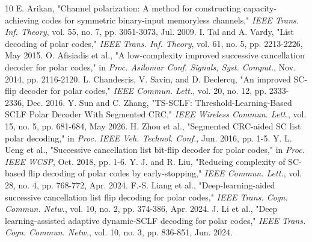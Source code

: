 \documentclass[journal,10pt,twocolumn]{IEEEtran}
\begin{document}
\begin{thebibliography}{10}
 E. Arikan, "Channel polarization: A method for constructing capacity-achieving codes for symmetric binary-input memoryless channels," \emph{IEEE Trans. Inf. Theory}, vol. 55, no. 7, pp. 3051-3073, Jul. 2009.
 I. Tal and A. Vardy, "List decoding of polar codes," \emph{IEEE Trans. Inf. Theory}, vol. 61, no. 5, pp. 2213-2226, May 2015.
 O. Afisiadis et al., "A low-complexity improved successive cancellation decoder for polar codes," in \emph{Proc. Asilomar Conf. Signals, Syst. Comput.}, Nov. 2014, pp. 2116-2120.
 L. Chandesris, V. Savin, and D. Declercq, "An improved SC-flip decoder for polar codes," \emph{IEEE Commun. Lett.}, vol. 20, no. 12, pp. 2333-2336, Dec. 2016.
 Y. Sun and C. Zhang, "TS-SCLF: Threshold-Learning-Based SCLF Polar Decoder With Segmented CRC," \emph{IEEE Wireless Commun. Lett.}, vol. 15, no. 5, pp. 681-684, May 2026.
 H. Zhou et al., "Segmented CRC-aided SC list polar decoding," in \emph{Proc. IEEE Veh. Technol. Conf.}, Jun. 2016, pp. 1-5.
 Y. L. Ueng et al., "Successive cancellation list bit-flip decoder for polar codes," in \emph{Proc. IEEE WCSP}, Oct. 2018, pp. 1-6.
 Y. J. and R. Liu, "Reducing complexity of SC-based flip decoding of polar codes by early-stopping," \emph{IEEE Commun. Lett.}, vol. 28, no. 4, pp. 768-772, Apr. 2024.
 F.-S. Liang et al., "Deep-learning-aided successive cancellation list flip decoding for polar codes," \emph{IEEE Trans. Cogn. Commun. Netw.}, vol. 10, no. 2, pp. 374-386, Apr. 2024.
 J. Li et al., "Deep learning-assisted adaptive dynamic-SCLF decoding for polar codes," \emph{IEEE Trans. Cogn. Commun. Netw.}, vol. 10, no. 3, pp. 836-851, Jun. 2024.
\end{thebibliography}
\end{document}
